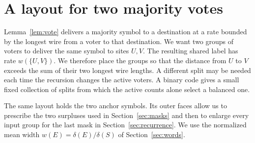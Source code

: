 \section{A layout for two majority votes}\label{sec:geometry}

Lemma~\ref{lem:vote} delivers a majority symbol to a destination at a
rate bounded by the longest wire from a voter to that destination. We
want two groups of voters to deliver the same symbol to sites \(U,V\).
The resulting shared label has rate \(w(\{U,V\})\). We therefore place
the groups so that the distance from \(U\) to \(V\) exceeds the sum of
their two longest wire lengths. A different split may be needed each
time the recursion changes the active voters. A binary code gives
a small fixed collection of splits from which the active counts alone
select a balanced one.

The same layout holds the two anchor symbols. Its outer faces allow us
to prescribe the two surpluses used in Section~\ref{sec:masks} and then
to enlarge every input group for the last mask in
Section~\ref{sec:recurrence}. We use the normalized mean width
\(w(E)=\delta(E)/\delta(S)\) of Section~\ref{sec:words}.

